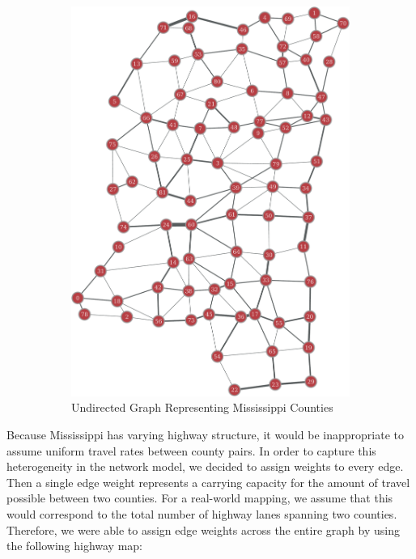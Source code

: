 \documentclass[titlepage]{article}
\begin{document}
\begin{figure}[H]
\begin{subfigure}[b]{0.5\textwidth}
      \includegraphics[width=\linewidth]{figures/full_undirected-crop.pdf}
      \caption*{Undirected Graph Representing Mississippi Counties}
    \end{subfigure}
    \caption*{}
  \end{figure}
  \par
     Because Mississippi has varying highway structure, it would be inappropriate to assume uniform travel rates between county pairs. In order to capture this heterogeneity in the network model, we decided to assign weights to every edge. Then a single edge weight represents a carrying capacity for the amount of travel possible between two counties. For a real-world mapping, we assume that this would correspond to the total number of highway lanes spanning two counties. Therefore, we were able to assign edge weights across the entire graph by using the following highway map:
\end{document}
